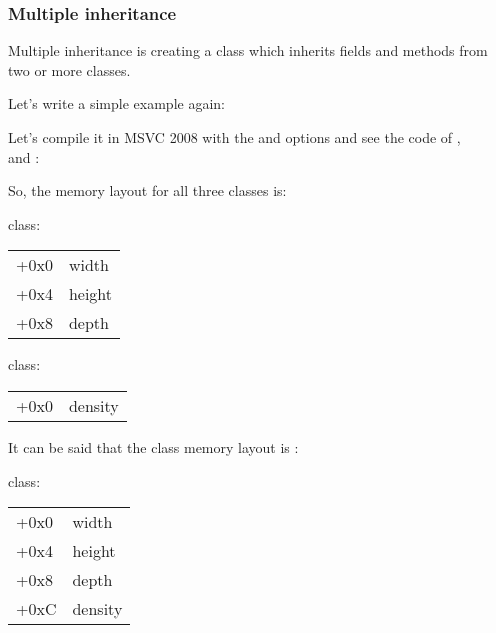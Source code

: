 \subsubsection{Multiple inheritance}


Multiple inheritance is creating a class which inherits fields and methods from two or more classes.

Let's write a simple example again:




Let's compile it in MSVC 2008 with the \Ox and \Obzero options and see the code of ,\\
 and :








So, the memory layout for all three classes is:

 class:

\begin{center}
\begin{tabular}{ | l | l | }
\hline
  \tableheader{} \\
\hline
  +0x0 & width \\
\hline
  +0x4 & height \\
\hline
  +0x8 & depth \\
\hline
\end{tabular}
\end{center}

 class:

\begin{center}
\begin{tabular}{ | l | l | }
\hline
  \tableheader{} \\
\hline
  +0x0 & density \\
\hline
\end{tabular}
\end{center}


It can be said that the  class memory layout is :

 class:

\begin{center}
\begin{tabular}{ | l | l | }
\hline
  \tableheader{} \\
\hline
  +0x0 & width \\
\hline
  +0x4 & height \\
\hline
  +0x8 & depth \\
\hline
  +0xC & density \\
\hline
\end{tabular}
\end{center}


